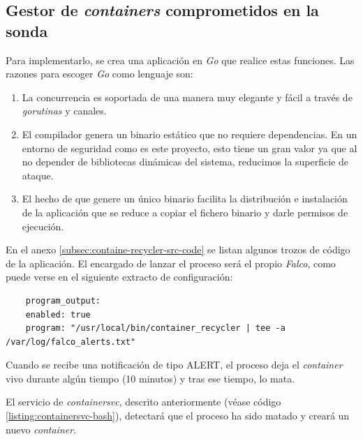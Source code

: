 \subsection{Gestor de \emph{containers} comprometidos en la sonda}


Para implementarlo, se crea una aplicación en \emph{Go} que realice estas funciones. Las razones para escoger \emph{Go} como lenguaje son:

\begin{enumerate}
    \item La concurrencia es soportada de una manera muy elegante y fácil a través de \emph{gorutinas} y canales.
    \item El compilador genera un binario estático que no requiere dependencias. En un entorno de seguridad como es este proyecto, esto
    tiene un gran valor ya que al no depender de bibliotecas dinámicas del sistema, reducimos la superficie de ataque.
    \item El hecho de que genere un único binario facilita la distribución e instalación de la aplicación que se reduce a copiar el fichero binario y darle permisos de ejecución.
\end{enumerate}

En el anexo \ref{subsec:containe-recycler-src-code} se listan algunos trozos de código de la aplicación. El encargado de lanzar el proceso será el propio
\emph{Falco}, como puede verse en el siguiente extracto de configuración:

\begin{verbatim}
    program_output:
    enabled: true
    program: "/usr/local/bin/container_recycler | tee -a /var/log/falco_alerts.txt"
\end{verbatim}
\bigskip


Cuando se recibe una notificación de tipo ALERT, el proceso deja el \emph{container} vivo durante algún tiempo (10 minutos) y tras ese tiempo, lo mata.

El servicio de \emph{containersvc}, descrito anteriormente (véase código \ref{listing:containersvc-bash}), detectará que el proceso ha sido matado
y creará un nuevo \emph{container}.

